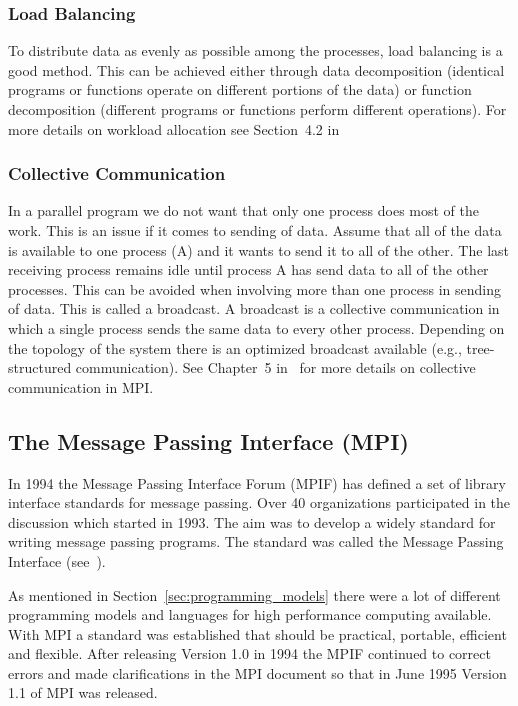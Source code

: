 \subsubsection{Load Balancing}

To distribute data as evenly as possible among the processes, load
balancing is a good method. This can be achieved either through data
decomposition (identical programs or functions operate on different
portions of the data) or function decomposition (different programs or
functions perform different operations). For more details on workload
allocation see Section~4.2 in~\cite{geist94pvm} 

\subsubsection{Collective Communication}

In a parallel program we do not want that only one process does most of
the work. This is an issue if it comes to sending of data. Assume that
all of the data is available to one process (A) and it wants to send it to
all of the other. The last receiving process remains idle until
process A has send data to all of the other processes. This can be
avoided when involving more than one process in sending of data. This
is called a broadcast.
A broadcast is a collective communication in which a single process
sends the same data to every other process. Depending on the topology
of the system there is an optimized broadcast available
(e.g., tree-structured communication). See Chapter~5
in~\cite{pacheco97mpi} for more details on collective communication in
MPI.

\subsection{The Message Passing Interface (MPI)}
\label{sec:MPI}

In 1994 the Message Passing Interface Forum (MPIF) has defined a set
of library interface standards for message passing. Over 40
organizations participated in the discussion which started in
1993. The aim was to develop a widely standard for writing
message passing programs. The standard was called the Message Passing
Interface (see~\cite{forum94:MPI}).

As mentioned in Section~\ref{sec:programming_models} there
were a lot of different programming models and languages for high
performance computing available. With MPI a standard was established
that should be practical, portable, efficient and flexible. After
releasing Version 1.0 in 1994 the MPIF continued to correct errors and
made clarifications in the MPI document so that in June 1995 Version
1.1 of MPI was released.

